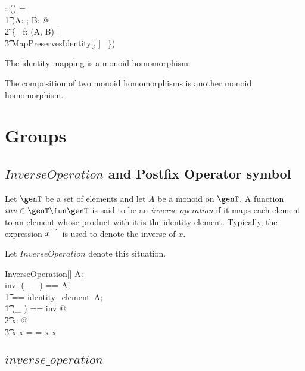 \documentclass{amsart}
\begin{document}
\begin{gendef}[\genT, \genU]
\homMonoid: \monoid \genT \cross \monoid \genU \fun \power (\genT \fun \genU)
\where
\homMonoid = \\
\t1	(\lambda A: \monoid \genT; B: \monoid \genU @ \\
\t2		\{~ f: \homSemigroup(A, B) | \\
\t3			MapPreservesIdentity[\genT, \genU] ~\})
\end{gendef}

\begin{remark}
The identity mapping is a monoid homomorphism.
\end{remark}

\begin{remark}
The composition of two monoid homomorphisms is another monoid homomorphism.
\end{remark}

\section{Groups}

\subsection{$InverseOperation$ and Postfix Operator symbol }

Let $\genT$ be a set of elements and let $A$ be a monoid on $\genT$.
A function $inv \in \genT \fun \genT$ is said to be an {\em inverse operation} if it maps each element
to an element whose product with it is the identity element.
Typically, the expression $x ^{-1}$ is used to denote the inverse of $x$.

Let $InverseOperation$ denote this situation.

\begin{schema}{InverseOperation}[\genT]
A: \monoid \genT \\
inv: \genT \fun \genT
\where
\LET (\_ \mulG \_) == A; \\
\t1	\oneG == identity\_element~A; \\
\t1	(\_ \invG) == inv @ \\
\t2		\forall x: \genT @ \\
\t3			x \mulG x \invG = \oneG = x \invG  \mulG x
\end{schema}

\subsection{$inverse\_operation$}
\end{document}
